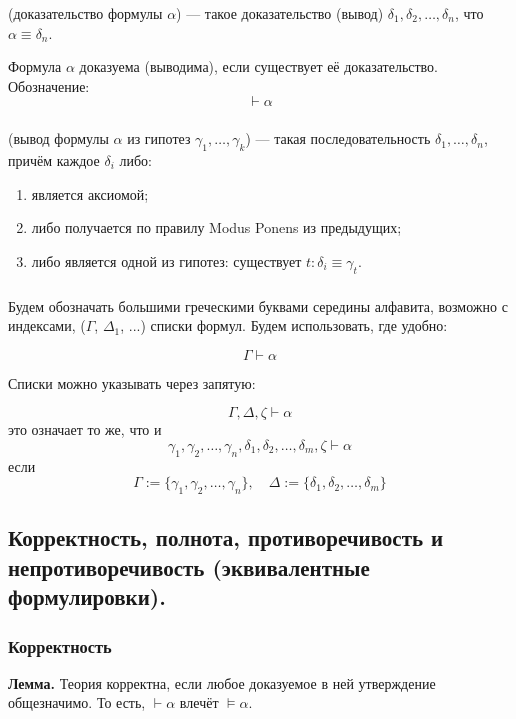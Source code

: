 \documentclass[10pt,a4paper,oneside]{article}
\begin{document}
\subsubsection{}

(доказательство формулы $\alpha$)
--- такое доказательство (вывод) $\delta_1, \delta_2, \dots, \delta_n$,
что $\alpha\equiv\delta_n$.

Формула $\alpha$ доказуема (выводима), если существует её доказательство. Обозначение:
$$\vdash \alpha$$

\subsubsection{}
(вывод формулы $\alpha$ из гипотез $\gamma_1,\dots,\gamma_k$)
    --- такая последовательность
    $\delta_1,\dots,\delta_n$, причём каждое $\delta_i$ либо:
    \begin{enumerate}
    \item является аксиомой;
    \item либо получается по правилу Modus Ponens из предыдущих;
    \item либо является одной из гипотез: существует $t: \delta_i \equiv \gamma_t$.
    \end{enumerate}

\subsubsection{}
Будем обозначать большими греческими буквами середины
алфавита, возможно с индексами, ($\Gamma$, $\Delta_1$, ...) списки формул.
Будем использовать, где удобно:

$$\Gamma \vdash \alpha$$\pause

Списки можно указывать через запятую:

$$\Gamma, \Delta, \zeta \vdash \alpha$$\pause
это означает то же, что и 
$$\gamma_1,\gamma_2,\dots,\gamma_n,\delta_1,\delta_2,\dots,\delta_m,\zeta\vdash\alpha$$
если 
$$\Gamma := \{\gamma_1,\gamma_2,\dots,\gamma_n\},\quad \Delta := \{\delta_1,\delta_2,\dots,\delta_m\}$$


\subsection{Корректность, полнота, противоречивость и непротиворечивость (эквивалентные формулировки).}

\subsubsection{Корректность}
\textbf{ Лемма. }
Теория корректна, если любое доказуемое в ней утверждение общезначимо.
То есть, $\vdash\alpha$ влечёт $\models\alpha$.
\end{document}

